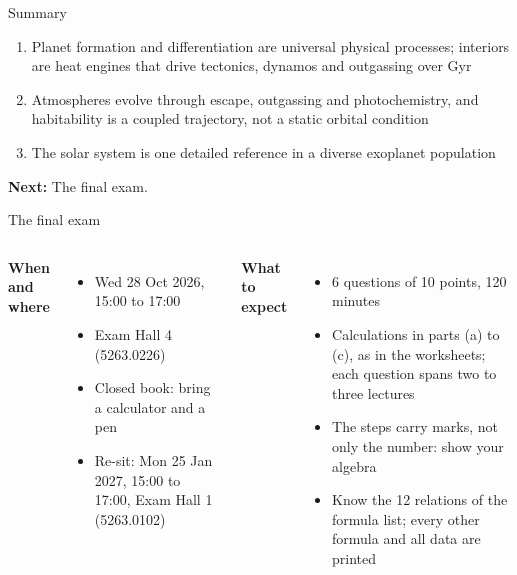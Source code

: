 \documentclass[aspectratio=169, 11pt]{beamer}
\begin{document}
\begin{frame}
\end{frame}

\begin{frame}{Summary}
  \begin{enumerate}\setlength\itemsep{6pt}
    \item Planet formation and differentiation are universal physical processes; interiors are heat engines that drive tectonics, dynamos and outgassing over Gyr
    \item Atmospheres evolve through escape, outgassing and photochemistry, and habitability is a coupled trajectory, not a static orbital condition
    \item The solar system is one detailed reference in a diverse exoplanet population
  \end{enumerate}
  \vskip8pt
  \textbf{Next:} The final exam.
\end{frame}

\begin{frame}{The final exam}
  \small
  \begin{columns}[T]
    \textbf{When and where}
    \begin{itemize}\setlength\itemsep{3pt}
      \item Wed 28 Oct 2026, 15:00 to 17:00
      \item Exam Hall 4 (5263.0226)
      \item Closed book: bring a calculator and a pen
      \item Re-sit: Mon 25 Jan 2027, 15:00 to 17:00, Exam Hall 1 (5263.0102)
    \end{itemize}
    \textbf{What to expect}
    \begin{itemize}\setlength\itemsep{3pt}
      \item 6 questions of 10 points, 120 minutes
      \item Calculations in parts (a) to (c), as in the worksheets; each question spans two to three lectures
      \item The steps carry marks, not only the number: show your algebra
      \item Know the 12 relations of the formula list; every other formula and all data are printed
    \end{itemize}
  \end{columns}
  \vskip6pt
\end{frame}
\end{document}
